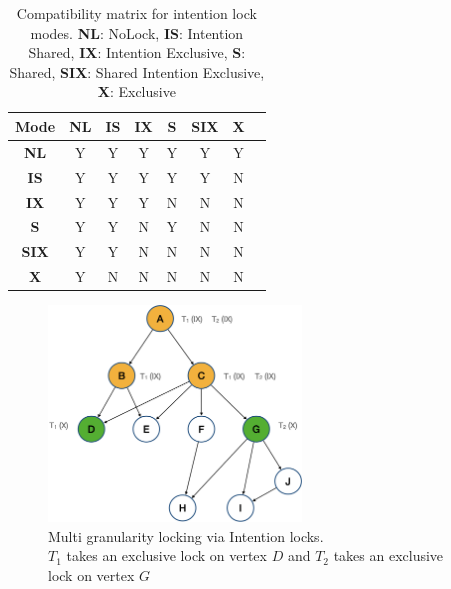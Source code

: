 \begin{table}[h]
    \centering
    \captionsetup{justification=centering}
    \begin{tabular}{c|ccccccc}
        \textbf{Mode} & \textbf{NL} & \textbf{IS} & \textbf{IX} & \textbf{S} & \textbf{SIX} & \textbf{X}\\
        \hline
        \textbf{NL} & \cellcolor{green!25} Y & \cellcolor{green!25} Y & \cellcolor{green!25} Y & \cellcolor{green!25} Y & \cellcolor{green!25} Y & \cellcolor{green!25} Y \\
        \textbf{IS} &  \cellcolor{green!25} Y & \cellcolor{green!25} Y & \cellcolor{green!25} Y & \cellcolor{green!25} Y & \cellcolor{green!25} Y & \cellcolor{red!25} N \\
        \textbf{IX} &  \cellcolor{green!25} Y & \cellcolor{green!25} Y & \cellcolor{green!25} Y & \cellcolor{red!25} N & \cellcolor{red!25} N & \cellcolor{red!25} N \\
        \textbf{S} &  \cellcolor{green!25} Y & \cellcolor{green!25} Y & \cellcolor{red!25} N & \cellcolor{green!25} Y & \cellcolor{red!25} N & \cellcolor{red!25} N \\
        \textbf{SIX} &  \cellcolor{green!25} Y & \cellcolor{green!25} Y & \cellcolor{red!25} N & \cellcolor{red!25} N & \cellcolor{red!25} N & \cellcolor{red!25} N \\
        \textbf{X} &  \cellcolor{green!25} Y & \cellcolor{red!25} N & \cellcolor{red!25} N & \cellcolor{red!25} N & \cellcolor{red!25} N & \cellcolor{red!25} N \\
    \end{tabular}
    \caption{Compatibility matrix for intention lock modes. \textbf{NL}: NoLock, \textbf{IS}: Intention Shared, \textbf{IX}: Intention Exclusive, \textbf{S}: Shared, \textbf{SIX}: Shared Intention Exclusive, \textbf{X}: Exclusive}
    \label{tab:intention_locks}
\end{table}



\begin{figure}[h]
    \centering
    \captionsetup{justification=centering}
    \includegraphics[width=0.6\textwidth]{figures/IntentionLockExample.png}
    \caption{Multi granularity locking via Intention locks. \\ $T_1$ takes an exclusive lock on vertex $D$ and $T_2$ takes an exclusive lock on vertex $G$ }
    \label{fig:intention_lock_example}
\end{figure}

